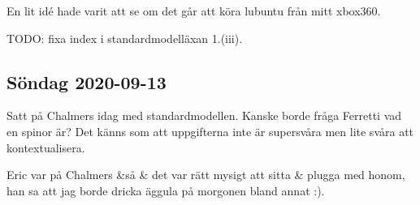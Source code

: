 En lit idé hade varit att se om det går att köra lubuntu från mitt xbox360.

TODO: fixa index i standardmodelläxan 1.(iii). \checkmark


\subsection{Söndag 2020-09-13}

Satt på Chalmers idag med standardmodellen. Kanske borde fråga Ferretti vad en spinor är? Det känns som att uppgifterna inte är supersvåra men lite svåra att kontextualisera.

Eric var på Chalmers \&så \& det var rätt mysigt att sitta \& plugga med honom, han sa att jag borde dricka äggula på morgonen bland annat :).


